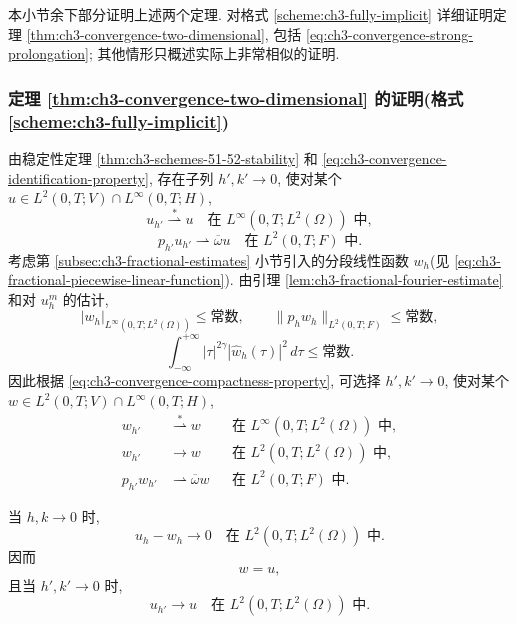 本小节余下部分证明上述两个定理. 对格式 \ref{scheme:ch3-fully-implicit} 详细证明定理 \ref{thm:ch3-convergence-two-dimensional}, 包括 \eqref{eq:ch3-convergence-strong-prolongation}; 其他情形只概述实际上非常相似的证明.

\subsubsection{定理 \ref{thm:ch3-convergence-two-dimensional} 的证明(格式 \ref{scheme:ch3-fully-implicit})}
\label{subsubsec:ch3-proof-convergence-2d-scheme-51}

由稳定性定理 \ref{thm:ch3-schemes-51-52-stability} 和 \eqref{eq:ch3-convergence-identification-property}, 存在子列 $h',k'\to0$, 使对某个 $u\in L^2(0,T;V)\cap L^\infty(0,T;H)$,
\[
u_{h'}\stackrel{*}{\rightharpoonup}u
\quad\text{在 }L^\infty(0,T;L^2(\Omega))\text{ 中},
\]
\begin{equation}
p_{h'}u_{h'}\rightharpoonup\overline\omega u
\quad\text{在 }L^2(0,T;F)\text{ 中}.
\label{eq:ch3-proof-convergence-u-subsequence}
\end{equation}
考虑第 \ref{subsec:ch3-fractional-estimates} 小节引入的分段线性函数 $w_h$(见 \eqref{eq:ch3-fractional-piecewise-linear-function}). 由引理 \ref{lem:ch3-fractional-fourier-estimate} 和对 $u_h^m$ 的估计,
\[
|w_h|_{L^\infty(0,T;L^2(\Omega))}\leq\text{常数},
\qquad
\lVert p_hw_h\rVert_{L^2(0,T;F)}\leq\text{常数},
\]
\[
\int_{-\infty}^{+\infty}|\tau|^{2\gamma}|\widehat w_h(\tau)|^2\,d\tau
\leq\text{常数}.
\]
因此根据 \eqref{eq:ch3-convergence-compactness-property}, 可选择 $h',k'\to0$, 使对某个 $w\in L^2(0,T;V)\cap L^\infty(0,T;H)$,
\begin{equation}
\begin{aligned}
w_{h'}&\stackrel{*}{\rightharpoonup}w
&&\text{在 }L^\infty(0,T;L^2(\Omega))\text{ 中},\\
w_{h'}&\to w
&&\text{在 }L^2(0,T;L^2(\Omega))\text{ 中},\\
p_{h'}w_{h'}&\rightharpoonup\overline\omega w
&&\text{在 }L^2(0,T;F)\text{ 中}.
\end{aligned}
\label{eq:ch3-proof-convergence-w-subsequence}
\end{equation}

\begin{Lemma}
\label{lem:ch3-reconstruction-distance}
当 $h,k\to0$ 时,
\begin{equation}
u_h-w_h\to0
\quad\text{在 }L^2(0,T;L^2(\Omega))\text{ 中}.
\label{eq:ch3-reconstruction-distance}
\end{equation}
因而
\begin{equation}
w=u,
\label{eq:ch3-reconstruction-limit-identification}
\end{equation}
且当 $h',k'\to0$ 时,
\begin{equation}
u_{h'}\to u
\quad\text{在 }L^2(0,T;L^2(\Omega))\text{ 中}.
\label{eq:ch3-proof-convergence-strong-l2}
\end{equation}
\end{Lemma}

